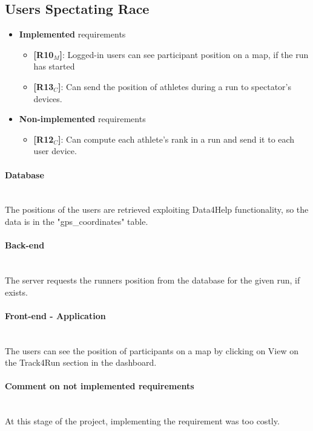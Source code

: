 \subsection{Users Spectating Race}
\begin{itemize}
    \item \textbf{Implemented} requirements
        \begin{itemize}
        
        
        \item \textbf{[R10$_M$]}: Logged-in users can see participant position on a map, if the run has started



    \item \textbf{[R13$_C$]}: Can send the position of athletes during a run to spectator's devices.


        \end{itemize}
    \item \textbf{Non-implemented} requirements
    \begin{itemize}
\item \textbf{[R12$_C$]}: Can compute each athlete's rank in a run and send it to each user device.
        \end{itemize}
\end{itemize}

\paragraph{Database} \mbox{}\\
The positions of the users are retrieved exploiting Data4Help functionality, so the data is in the "gps\_coordinates" table.

\paragraph{Back-end} \mbox{}\\
The server requests the runners position from the database for the given run, if exists.

\paragraph{Front-end - Application} \mbox{}\\
The users can see the position of participants on a map by clicking on View on the Track4Run section in the dashboard.

\paragraph{Comment on not implemented requirements} \mbox{}\\ 
At this stage of the project, implementing the requirement was too costly.